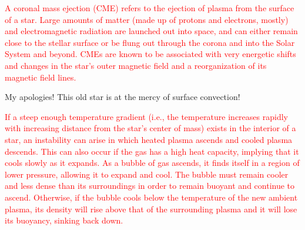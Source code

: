 \documentclass[main.tex]{subfiles}
\begin{document}
\begin{tcolorbox}[sharp corners, colback=red!30, colframe=red!80!blue, title=Coronal Mass Ejections]
\par \textcolor{red} {A coronal mass ejection (CME) refers to the ejection of plasma from the surface of a star.  Large amounts of matter (made up of protons and electrons, mostly) and electromagnetic radiation are launched out into space, and can either remain close to the stellar surface or be flung out through the corona and into the Solar System and beyond.  CMEs are known to be associated with very energetic shifts and changes in the star's outer magnetic field and a reorganization of its magnetic field lines.} 
\end{tcolorbox} 

\par \Enrico My apologies!  This old star is at the mercy of surface convection!

\begin{tcolorbox}[sharp corners, colback=red!30, colframe=red!80!blue, title=Convection]
\par \textcolor{red} {If a steep enough temperature gradient (i.e., the temperature increases rapidly with increasing distance from the star's center of mass) exists in the interior of a star, an instability can arise in which heated plasma ascends and cooled plasma descends. This can also occur if the gas has a high heat capacity, implying that it cools slowly as it expands.  As a bubble of gas ascends, it finds itself in a region of lower pressure, allowing it to expand and cool.  The bubble must remain cooler and less dense than its surroundings in order to remain buoyant and continue to ascend.  Otherwise, if the bubble cools below the temperature of the new ambient plasma, its density will rise above that of the surrounding plasma and it will lose its buoyancy, sinking back down.} 
\end{tcolorbox} 
\end{document}

